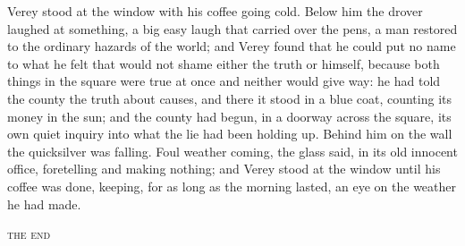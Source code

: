 \documentclass[11pt]{article}
\begin{document}
Verey stood at the window with his coffee going cold. Below him the drover laughed at something, a big easy laugh that carried over the pens, a man restored to the ordinary hazards of the world; and Verey found that he could put no name to what he felt that would not shame either the truth or himself, because both things in the square were true at once and neither would give way: he had told the county the truth about causes, and there it stood in a blue coat, counting its money in the sun; and the county had begun, in a doorway across the square, its own quiet inquiry into what the lie had been holding up. Behind him on the wall the quicksilver was falling. Foul weather coming, the glass said, in its old innocent office, foretelling and making nothing; and Verey stood at the window until his coffee was done, keeping, for as long as the morning lasted, an eye on the weather he had made.

\vspace{2\baselineskip}
{\centering\scshape the end\par}
\end{document}
